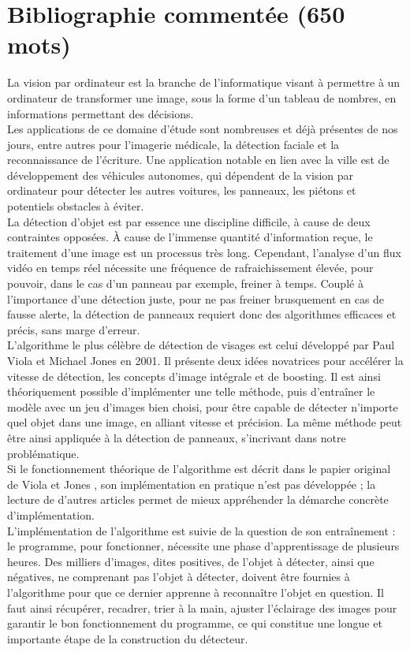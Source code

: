 \documentclass[12pt,a4paper]{article}
\begin{document}
\section{Bibliographie commentée (650 mots)}
La vision par ordinateur est la branche de l’informatique visant à permettre à un ordinateur de transformer une image, sous la forme d’un tableau de nombres, en informations permettant des décisions. \cite{ibm} \\
Les applications de ce domaine d’étude sont nombreuses et déjà présentes de nos jours, entre autres pour l’imagerie médicale, la détection faciale et la reconnaissance de l’écriture. \cite{ibm}\cite{szeliski} Une application notable en lien avec la ville est de développement des véhicules autonomes, qui dépendent de la vision par ordinateur pour détecter les autres voitures, les panneaux, les piétons et potentiels obstacles à éviter. \cite{ibm} \\
La détection d’objet est par essence une discipline difficile, à cause de deux contraintes opposées. À cause de l’immense quantité d’information reçue, le traitement d’une image est un processus très long. Cependant, l’analyse d’un flux vidéo en temps réel nécessite une fréquence de rafraichissement élevée, pour pouvoir, dans le cas d’un panneau par exemple, freiner à temps. Couplé à l’importance d’une détection juste, pour ne pas freiner brusquement en cas de fausse alerte, la détection de panneaux requiert donc des algorithmes efficaces et précis, sans marge d’erreur. \\
L’algorithme le plus célèbre \cite{szeliski} de détection de visages est celui développé par Paul Viola et Michael Jones \cite{viola-jones} en 2001. Il présente deux idées novatrices pour accélérer la vitesse de détection, les concepts d’image intégrale et de boosting\cite{computerphile}. Il est ainsi théoriquement possible d’implémenter une telle méthode, puis d’entraîner le modèle avec un jeu d’images bien choisi, pour être capable de détecter n’importe quel objet dans une image, en alliant vitesse et précision. La même méthode peut être ainsi appliquée à la détection de panneaux, s'incrivant dans notre problématique. \\
Si le fonctionnement théorique de l’algorithme est décrit dans le papier original de Viola et Jones \cite{viola-jones}, son implémentation en pratique n’est pas développée ; la lecture de d’autres articles \cite{wang}\cite{parande} permet de mieux appréhender la démarche concrète d’implémentation. \\
L’implémentation de l’algorithme est suivie de la question de son entraînement : le programme, pour fonctionner, nécessite une phase d’apprentissage de plusieurs heures. Des milliers d’images, dites positives, de l’objet à détecter, ainsi que négatives, ne comprenant pas l’objet à détecter, doivent être fournies à l’algorithme pour que ce dernier apprenne à reconnaître l’objet en question. Il faut ainsi récupérer, recadrer, trier à la main, ajuster l’éclairage des images \cite{viola-jones}\cite{wang} pour garantir le bon fonctionnement du programme, ce qui constitue une longue et importante étape de la construction du détecteur. \\
\end{document}
